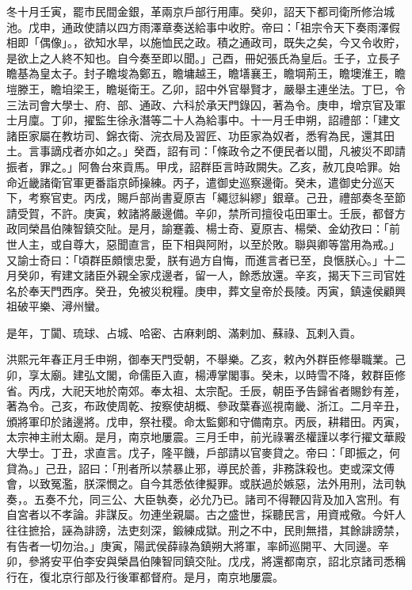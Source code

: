 \begin{pinyinscope}
冬十月壬寅，罷市民間金銀，革兩京戶部行用庫。癸卯，詔天下都司衛所修治城池。戊申，通政使請以四方雨澤章奏送給事中收貯。帝曰：「祖宗令天下奏雨澤假相即「偶像」。，欲知水旱，以施恤民之政。積之通政司，既失之矣，今又令收貯，是欲上之人終不知也。自今奏至即以聞。」己酉，冊妃張氏為皇后。壬子，立長子瞻基為皇太子。封子瞻埈為鄭五，瞻墉越王，瞻墡襄王，瞻堈荊王，瞻墺淮王，瞻塏滕王，瞻垍梁王，瞻埏衛王。乙卯，詔中外官舉賢才，嚴舉主連坐法。丁巳，令三法司會大學士、府、部、通政、六科於承天門錄囚，著為令。庚申，增京官及軍士月廩。丁卯，擢監生徐永潛等二十人為給事中。十一月壬申朔，詔禮部：「建文諸臣家屬在教坊司、錦衣衛、浣衣局及習匠、功臣家為奴者，悉宥為民，還其田土。言事謫戍者亦如之。」癸酉，詔有司：「條政令之不便民者以聞，凡被災不即請振者，罪之。」阿魯台來貢馬。甲戌，詔群臣言時政闕失。乙亥，赦兀良哈罪。始命近畿諸衛官軍更番詣京師操練。丙子，遣御史巡察邊衛。癸未，遣御史分巡天下，考察官吏。丙戌，賜戶部尚書夏原吉「繩愆糾繆」銀章。己丑，禮部奏冬至節請受賀，不許。庚寅，敕諸將嚴邊備。辛卯，禁所司擅役屯田軍士。壬辰，都督方政同榮昌伯陳智鎮交阯。是月，諭蹇義、楊士奇、夏原吉、楊榮、金幼孜曰：「前世人主，或自尊大，惡聞直言，臣下相與阿附，以至於敗。聯與卿等當用為戒。」又諭士奇曰：「頃群臣頗懷忠愛，朕有過方自悔，而進言者已至，良愜朕心。」十二月癸卯，宥建文諸臣外親全家戍邊者，留一人，餘悉放還。辛亥，揭天下三司官姓名於奉天門西序。癸丑，免被災稅糧。庚申，葬文皇帝於長陵。丙寅，鎮遠侯顧興祖破平樂、潯州蠻。

是年，丁闐、琉球、占城、哈密、古麻剌朗、滿剌加、蘇祿、瓦剌入貢。

洪熙元年春正月壬申朔，御奉天門受朝，不舉樂。乙亥，敕內外群臣修舉職業。己卯，享太廟。建弘文閣，命儒臣入直，楊溥掌閣事。癸未，以時雪不降，敕群臣修省。丙戌，大祀天地於南郊。奉太祖、太宗配。壬辰，朝臣予告歸省者賜鈔有差，著為令。己亥，布政使周乾、按察使胡概、參政葉春巡視南畿、浙江。二月辛丑，頒將軍印於諸邊將。戊申，祭社稷。命太監鄭和守備南京。丙辰，耕耤田。丙寅，太宗神主祔太廟。是月，南京地屢震。三月壬申，前光祿署丞權謹以孝行擢文華殿大學士。丁丑，求直言。戊子，隆平饑，戶部請以官麥貸之。帝曰：「即振之，何貸為。」己丑，詔曰：「刑者所以禁暴止邪，導民於善，非務誅殺也。吏或深文傅會，以致冤濫，朕深憫之。自今其悉依律擬罪。或朕過於嫉惡，法外用刑，法司執奏，。五奏不允，同三公、大臣執奏，必允乃已。諸司不得鞭囚背及加入宮刑。有自宮者以不孝論。非謀反。勿連坐親屬。古之盛世，採聽民言，用資戒儆。今奸人往往摭拾，誣為誹謗，法吏刻深，鍛練成獄。刑之不中，民則無措，其餘誹謗禁，有告者一切勿治。」庚寅，陽武侯薛祿為鎮朔大將軍，率師巡開平、大同邊。辛卯，參將安平伯李安與榮昌伯陳智同鎮交阯。戊戌，將還都南京，詔北京諸司悉稱行在，復北京行部及行後軍都督府。是月，南京地屢震。


\end{pinyinscope}

